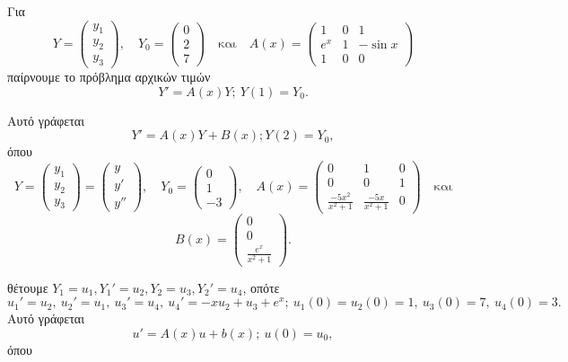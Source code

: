 \documentclass[11pt,a4paper,twoside]{book}
\begin{document}
\begin{rlist}
\[\]
\item Για
\[
Y = \begin{pmatrix} y_1 \\ y_2 \\ y_3 \end{pmatrix}, \quad Y_0 = \begin{pmatrix} 0 \\ 2 \\ 7 \end{pmatrix} \quad \text{και} \quad A(x) = \begin{pmatrix} 1 & 0 & 1 \\ e^x & 1 & -\sin x \\ 1 & 0 & 0 \end{pmatrix}
\]
παίρνουμε το πρόβλημα αρχικών τιμών
\[
Y' = A(x)Y; \ Y(1)=Y_0.
\]
\item Αυτό γράφεται
\[
Y' = A(x)Y+B(x); Y(2)=Y_0,
\]
όπου
\[
Y = \begin{pmatrix} y_1 \\ y_2 \\ y_3 \end{pmatrix} = \begin{pmatrix} y \\ y' \\ y'' \end{pmatrix}, \quad Y_0 = \begin{pmatrix} 0 \\ 1 \\ -3 \end{pmatrix}, \quad A(x) = \begin{pmatrix} 0 & 1 & 0 \\ 0 & 0 & 1 \\ \frac{-5x^2}{x^2+1} & \frac{-5x}{x^2+1} & 0 \end{pmatrix} \quad \text{και}
\]
\[
B(x) = \begin{pmatrix} 0 \\ 0 \\ \frac{e^x}{x^2+1} \end{pmatrix}.
\]
\item θέτουμε $Y_1=u_1, Y_1'=u_2, Y_2=u_3, Y_2'=u_4$, οπότε
\[
u_1'=u_2, \ u_2'=u_1, \ u_3'=u_4, \ u_4'=-xu_2+u_3+e^x; \ u_1(0)=u_2(0)=1, \ u_3(0)=7, \ u_4(0)=3.
\]
Αυτό γράφεται
\[
u' = A(x)u+b(x); \ u(0)=u_0,
\]
όπου
\[
\]
\end{rlist}
\end{document}
